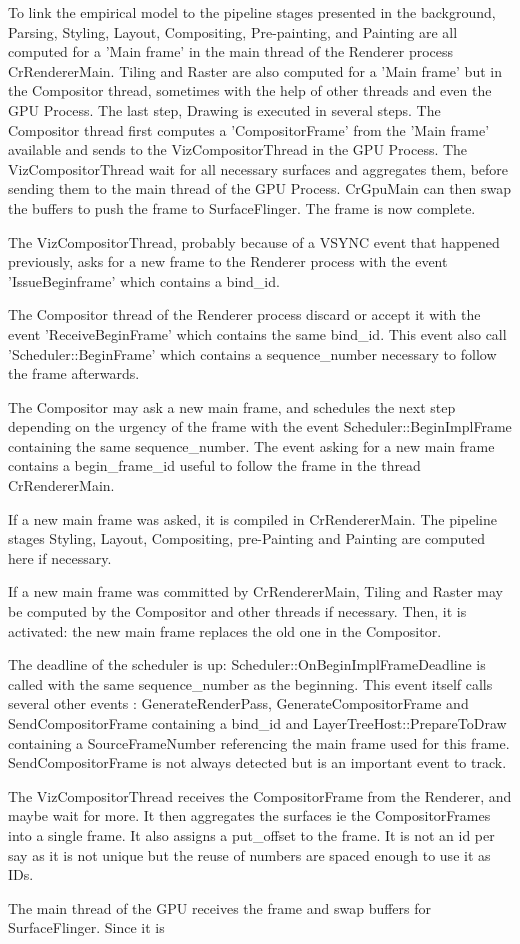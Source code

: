 To link the empirical model to the pipeline stages presented in the background, Parsing, Styling, Layout, Compositing, Pre-painting, and Painting are all computed for a 'Main frame' in the main thread of the Renderer process CrRendererMain. Tiling and Raster are also computed for a 'Main frame' but in the Compositor thread, sometimes with the help of other threads and even the GPU Process. The last step, Drawing is executed in several steps. The Compositor thread first computes a 'CompositorFrame' from the 'Main frame' available and sends to the VizCompositorThread in the GPU Process. The VizCompositorThread wait for all necessary surfaces and aggregates them, before sending them to the main thread of the GPU Process. CrGpuMain can then swap the buffers to push the frame to SurfaceFlinger. The frame is now complete.

\item The VizCompositorThread, probably because of a VSYNC event that happened previously, asks for a new frame to the Renderer process with the event 'IssueBeginframe' which contains a bind\_id.
    \item The Compositor thread of the Renderer process discard or accept it with the event 'ReceiveBeginFrame' which contains the same bind\_id. This event also call 'Scheduler::BeginFrame' which contains a sequence\_number necessary to follow the frame afterwards.
    \item The Compositor may ask a new main frame, and schedules the next step depending on the urgency of the frame with the event Scheduler::BeginImplFrame containing the same sequence\_number. The event asking for a new main frame contains a begin\_frame\_id useful to follow the frame in the thread CrRendererMain.
    \item If a new main frame was asked, it is compiled in CrRendererMain. The pipeline stages Styling, Layout, Compositing, pre-Painting and Painting are computed here if necessary.
    \item If a new main frame was committed by CrRendererMain, Tiling and Raster may be computed by the Compositor and other threads if necessary. Then, it is activated: the new main frame replaces the old one in the Compositor.
    \item The deadline of the scheduler is up: Scheduler::OnBeginImplFrameDeadline is called with the same sequence\_number as the beginning. This event itself calls several other events : GenerateRenderPass, GenerateCompositorFrame and SendCompositorFrame containing a bind\_id and LayerTreeHost::PrepareToDraw containing a SourceFrameNumber referencing the main frame used for this frame. SendCompositorFrame is not always detected but is an important event to track.
    \item The VizCompositorThread receives the CompositorFrame from the Renderer, and maybe wait for more. It then aggregates the surfaces ie the CompositorFrames into a single frame. It also assigns a put\_offset to the frame. It is not an id per say as it is not unique but the reuse of numbers are spaced enough to use it as IDs.
    \item The main thread of the GPU receives the frame and swap buffers for SurfaceFlinger. Since it is 
    
